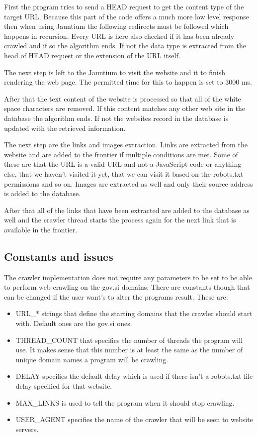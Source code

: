 \documentclass[9pt]{IEEEtran}
\begin{document}
First the program tries to send a HEAD request to get the content type of the target URL.
Because this part of the code offers a much more low level response then when using Jauntium the following redirects must be followed which happens in recursion.
Every URL is here also checked if it has been already crawled and if so the algorithm ends.
If not the data type is extracted from the head of HEAD request or the extension of the URL itself.

The next step is left to the Jauntium to visit the website and it to finish rendering the web page.
The permitted time for this to happen is set to 3000 ms. 

After that the text content of the website is processed so that all of the white space characters are removed. 
If this content matches any other web site in the database the algorithm ends.
If not the websites record in the database is updated with the retrieved information.

The next step are the links and images extraction.
Links are extracted from the website and are added to the frontier if multiple conditions are met.
Some of these are that the URL is a valid URL and not a JavaScript code or anything else, that we haven't visited it yet, that we can visit it based on the robots.txt permissions and so on.
Images are extracted as well and only their source address is added to the database.

After that all of the links that have been extracted are added to the database as well and the crawler thread starts the process again for the next link that is available in the frontier.

\subsection{Constants and issues}

The crawler implementation does not require any parameters to be set to be able to perform web crawling on the gov.si domains.
There are constants though that can be changed if the user want's to alter the programs result.
These are:
\begin{itemize}
\item{URL\_* strings that define the starting domains that the crawler should start with. Default ones are the gov.si ones.}
\item{THREAD\_COUNT that specifies the number of threads the program will use. It makes sense that this number is at least the same as the number of unique domain names a program will be crawling.}
\item{DELAY specifies the default delay which is used if there isn't a robots.txt file delay specified for that website.}
\item{MAX\_LINKS is used to tell the program when it should stop crawling.}
\item{USER\_AGENT specifies the name of the crawler that will be seen to website servers.}
\end{itemize}
\end{document}
